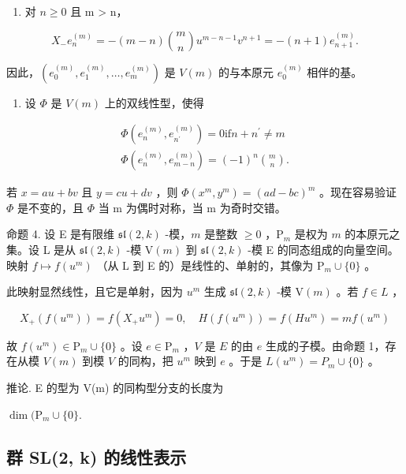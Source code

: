 \begin{enumerate}
\def\labelenumi{\arabic{enumi})}
\setcounter{enumi}{1}
\tightlist
\item
  对 \(n \geq 0\) 且 m \textgreater{} n，
\end{enumerate}

\[
X _ {-} e _ {n} ^ {(m)} = - (m - n) \binom{m}{n} u ^ {m - n - 1} v ^ {n + 1} = - (n + 1) e _ {n + 1} ^ {(m)}.
\]

因此，\((e_0^{(m)}, e_1^{(m)}, \ldots, e_m^{(m)})\) 是 \(V(m)\) 的与本原元 \(e_0^{(m)}\) 相伴的基。

\begin{enumerate}
\def\labelenumi{\arabic{enumi})}
\setcounter{enumi}{2}
\tightlist
\item
  设 \(\Phi\) 是 \(V(m)\) 上的双线性型，使得
\end{enumerate}

\[
\begin{array}{c} \varPhi (e _ {n} ^ {(m)}, e _ {n ^ {\prime}} ^ {(m)}) = 0 \text {if} n + n ^ {\prime} \neq m \\ \varPhi (e _ {n} ^ {(m)}, e _ {m - n} ^ {(m)}) = (- 1) ^ {n} \binom {m} {n}. \end{array}
\]

若 \(x = au + bv\) 且 \(y = cu + dv\) ，则 \(\Phi(x^{m}, y^{m}) = (ad - bc)^{m}\) 。现在容易验证 \(\Phi\) 是不变的，且 \(\Phi\) 当 m 为偶时对称，当 m 为奇时交错。

命题 4. 设 E 是有限维 \(\mathfrak{sl}(2,k)\) -模，\(m\) 是整数 \(\geq 0\) ，\(\mathrm{P}_m\) 是权为 \(m\) 的本原元之集。设 L 是从 \(\mathfrak{sl}(2,k)\) -模 \(\mathrm{V}(m)\) 到 \(\mathfrak{sl}(2,k)\) -模 E 的同态组成的向量空间。映射 \(f \mapsto f(u^m)\) （从 L 到 E 的）是线性的、单射的，其像为 \(\mathrm{P}_m \cup \{0\}\) 。

此映射显然线性，且它是单射，因为 \(u^{m}\) 生成 \(\mathfrak{sl}(2,k)\) -模 \(\mathrm{V}(m)\) 。若 \(f \in L\) ，

\[
X _ {+} (f (u ^ {m})) = f (X _ {+} u ^ {m}) = 0, \quad H (f (u ^ {m})) = f (H u ^ {m}) = m f (u ^ {m})
\]

故 \(f(u^{m}) \in \mathrm{P}_{m} \cup \{0\}\) 。设 \(e \in \mathrm{P}_{m}\) ，\(V\) 是 \(E\) 的由 \(e\) 生成的子模。由命题 1，存在从模 \(V(m)\) 到模 \(V\) 的同构，把 \(u^{m}\) 映到 \(e\) 。于是 \(L(u^{m}) = P_{m} \cup \{0\}\) 。

推论. E 的型为 V(m) 的同构型分支的长度为

\(\dim (\mathrm{P}_m\cup \{0\} .\)

\subsection{群 SL(2, k) 的线性表示}

